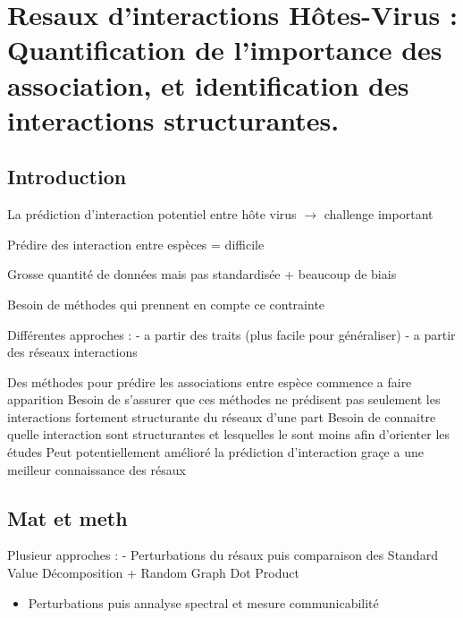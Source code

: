 \documentclass[
]{article}
\author{}
\date{\vspace{-2.5em}}
\providecommand{\tightlist}{%
  \setlength{\itemsep}{0pt}\setlength{\parskip}{0pt}}
\begin{document}
\hypertarget{resaux-dinteractions-huxf4tes-virus-quantification-de-limportance-des-association-et-identification-des-interactions-structurantes.}{%
\section{Resaux d'interactions Hôtes-Virus : Quantification de
l'importance des association, et identification des interactions
structurantes.}\label{resaux-dinteractions-huxf4tes-virus-quantification-de-limportance-des-association-et-identification-des-interactions-structurantes.}}

\hypertarget{introduction}{%
\subsection{Introduction}\label{introduction}}

La prédiction d'interaction potentiel entre hôte virus \(\rightarrow\)
challenge important

Prédire des interaction entre espèces = difficile

Grosse quantité de données mais pas standardisée + beaucoup de biais

Besoin de méthodes qui prennent en compte ce contrainte

Différentes approches : - a partir des traits (plus facile pour
généraliser) - a partir des réseaux interactions

Des méthodes pour prédire les associations entre espèce commence a faire
apparition Besoin de s'assurer que ces méthodes ne prédisent pas
seulement les interactions fortement structurante du réseaux d'une part
Besoin de connaitre quelle interaction sont structurantes et lesquelles
le sont moins afin d'orienter les études Peut potentiellement amélioré
la prédiction d'interaction graçe a une meilleur connaissance des résaux

\hypertarget{mat-et-meth}{%
\subsection{Mat et meth}\label{mat-et-meth}}

Plusieur approches : - Perturbations du résaux puis comparaison des
Standard Value Décomposition + Random Graph Dot Product

\begin{itemize}
\tightlist
\item
  Perturbations puis annalyse spectral et mesure communicabilité
\end{itemize}
\end{document}
